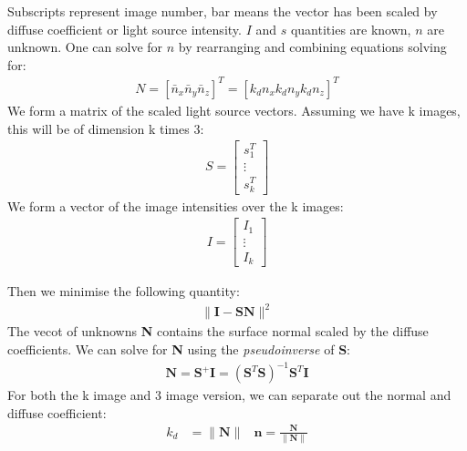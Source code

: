 \documentclass{article}
\begin{document}
Subscripts represent image number, bar means the vector has been scaled by diffuse coefficient or light source intensity.
$I$ and $s$ quantities are known, $n$ are unknown.
One can solve for $n$ by rearranging and combining equations solving for:
\begin{align*}
	N = {[\bar{n}_x \bar{n}_y \bar{n}_z]}^T = [k_dn_x k_dn_y k_dn_z]^T
\end{align*}
We form a matrix of the scaled light source vectors.
Assuming we have k images, this will be of dimension k times 3:
\begin{align*}
S = 
	\begin{bmatrix}
		s^T_1 \\
		\vdots \\
		s^T_k
	\end{bmatrix}
\end{align*}
We form a vector of the image intensities over the k images:
\begin{align*}
	I = 
	\begin{bmatrix}
		I_1 \\ 
		\vdots \\
		I_k
	\end{bmatrix}
\end{align*}

Then we minimise the following quantity:
\begin{align*}
	\|\textbf{I}-\textbf{SN}\|^2
\end{align*}
The vecot of unknowns \textbf{N} contains the surface normal scaled by the diffuse coefficients.
We can solve for \textbf{N} using the \textit{pseudoinverse} of \textbf{S}:
\begin{align*}
	\textbf{N} = \textbf{S}^+\textbf{I}=(\textbf{S}^T\textbf{S})^{-1}\textbf{S}^T\textbf{I}
\end{align*}
For both the k image and 3 image version, we can separate out the normal and diffuse coefficient:
\begin{align*}
	k_d &= \|\textbf{N}\| & \textbf{n}=\frac{\textbf{N}}{\|\textbf{N}\|}
\end{align*}
\end{document}

